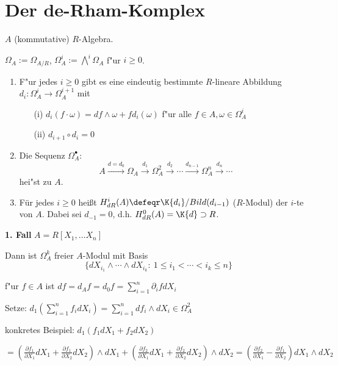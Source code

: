 \section{Der de-Rham-Komplex}

$A$ (kommutative) $R$-Algebra.

$\Omega_A := \Omega_{A/R}$, $\Omega^i_A := \bigwedge\nolimits^i\Omega_A$ f"ur $i \geq 0$.

\begin{SatzDef}
\begin{enumerate}
\item F"ur jedes $i \geq 0$ gibt es eine eindeutig bestimmte $R$-lineare Abbildung $d_i : \Omega^i_A \rightarrow \Omega^{i+1}_A$ mit
\begin{enumerate}
\item[(i)] $d_i(f \cdot \omega) = df \wedge \omega + f d_i(\omega)$ f"ur alle $f \in A, \omega \in \Omega^i_A$
\item[(ii)] $d_{i+1} \circ d_i = 0$
\end{enumerate}

\item
Die Sequenz $\Omega^\bullet_A$:
$$A \overset{d=d_0}{\longrightarrow} \Omega_A \overset{d_1}{\rightarrow} \Omega^2_A \overset{d_2}{\rightarrow} \cdots \overset{d_{n-1}}{\rightarrow} \Omega^n_A  \overset{d_n}{\rightarrow} \cdots$$
hei"st  zu $A$.

\item
F\"ur jedes $i\geq 0$ hei\ss t $H_{dR}^i(A)\defeqr
\K{d_i}/Bild(d_{i-1})$ ($R$-Modul)
der $i$-te  von $A$. Dabei sei $d_{-1}=0$, d.h.
$H_{dR}^0(A)=\K{d}\supset R$.

\end{enumerate}

\begin{Bew}
\textbf{1. Fall} $A = R[X_1, \ldots X_n]$

Dann ist $\Omega^k_A$ freier $A$-Modul mit Basis
\[
\{d X_{i_1} \wedge \cdots \wedge d X_{i_k}:\ 1 \leq i_1 < \cdots < i_k \leq n\}
\]

f"ur $f \in A$ ist $df = d_A f = d_0 f = \sum_{i=1}^n \partial_i f d X_i$

Setze: $d_1(\sum_{i=1}^n f_i d X_i) = \sum_{i=1}^n d f_i \wedge d X_i \in \Omega^2_A$

konkretes Beispiel: $d_1(f_1 dX_1 + f_2 dX_2)$

$= (\frac{\partial f_1}{\partial X_1} dX_1 + \frac{\partial f_1}{\partial X_2} dX_2) \wedge dX_1 + (\frac{\partial f_2}{\partial X_1} dX_1 + \frac{\partial f_2}{\partial X_2} dX_2) \wedge dX_2 = (\frac{\partial f_2}{\partial X_1} - \frac{\partial f_1}{\partial X_2}) dX_1 \wedge dX_2$


\end{Bew}
\end{SatzDef}
